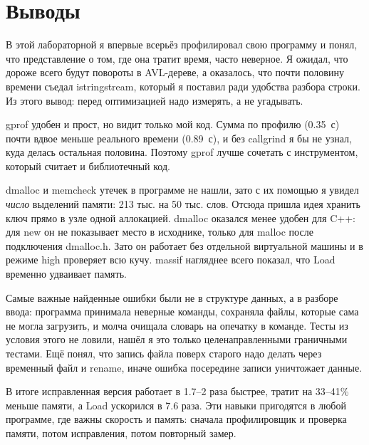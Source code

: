 \section{Выводы}

В этой лабораторной я впервые всерьёз профилировал свою программу и понял, что представление
о том, где она тратит время, часто неверное. Я ожидал, что дороже всего будут повороты в
AVL-дереве, а оказалось, что почти половину времени съедал {\ttfamily istringstream}, который я
поставил ради удобства разбора строки. Из этого вывод: перед оптимизацией надо измерять, а не
угадывать.

{\ttfamily gprof} удобен и прост, но видит только мой код. Сумма по профилю (0.35~с) почти вдвое
меньше реального времени (0.89~с), и без {\ttfamily callgrind} я бы не узнал, куда делась остальная
половина. Поэтому {\ttfamily gprof} лучше сочетать с инструментом, который считает и библиотечный код.

{\ttfamily dmalloc} и {\ttfamily memcheck} утечек в программе не нашли, зато с их помощью я увидел
\emph{число} выделений памяти: 213 тыс. на 50 тыс. слов. Отсюда пришла идея хранить ключ прямо в
узле одной аллокацией. {\ttfamily dmalloc} оказался менее удобен для C++: для {\ttfamily new} он не
показывает место в исходнике, только для {\ttfamily malloc} после подключения {\ttfamily dmalloc.h}.
Зато он работает без отдельной виртуальной машины и в режиме {\ttfamily high} проверяет всю кучу.
{\ttfamily massif} нагляднее всего показал, что {\ttfamily Load} временно удваивает память.

Самые важные найденные ошибки были не в структуре данных, а в разборе ввода: программа принимала
неверные команды, сохраняла файлы, которые сама не могла загрузить, и молча очищала словарь на
опечатку в команде. Тесты из условия этого не ловили, нашёл я это только целенаправленными
граничными тестами. Ещё понял, что запись файла поверх старого надо делать через временный файл
и {\ttfamily rename}, иначе ошибка посередине записи уничтожает данные.

В итоге исправленная версия работает в 1.7--2 раза быстрее, тратит на 33--41\% меньше памяти, а
{\ttfamily Load} ускорился в 7.6 раза. Эти навыки пригодятся в любой программе, где важны скорость
и память: сначала профилировщик и проверка памяти, потом исправления, потом повторный замер.
\pagebreak
